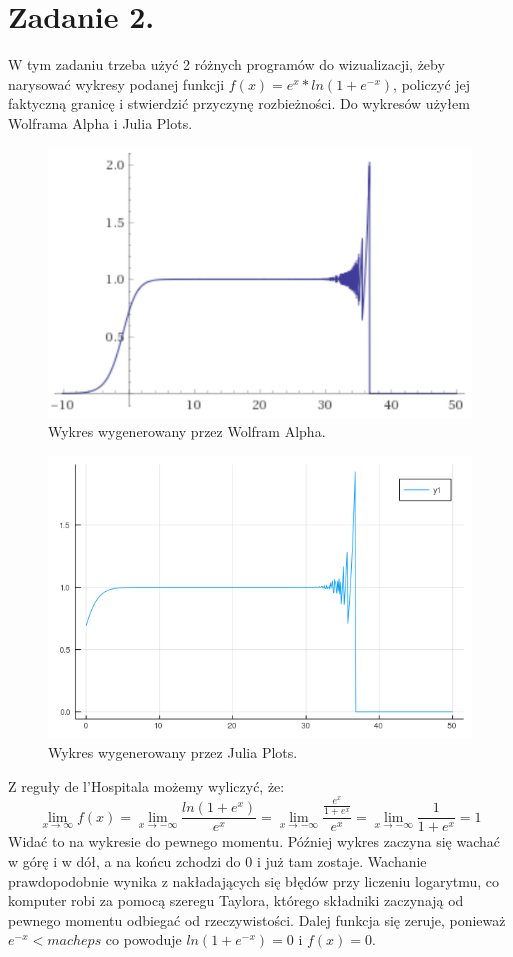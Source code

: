 \documentclass{article}
\begin{document}
\section{Zadanie 2.}
W tym zadaniu trzeba użyć 2 różnych programów do wizualizacji, żeby narysować wykresy podanej funkcji $f(x) = e^x*ln(1+ e^{-x})$, policzyć jej faktyczną granicę i stwierdzić przyczynę rozbieżności. Do wykresów użyłem Wolframa Alpha i Julia Plots.
\begin{figure}[H]
	\includegraphics[width=\linewidth]{wolfram-wykres.png}
	\caption{Wykres wygenerowany przez Wolfram Alpha.}
	\label{fig:wolfram}
\end{figure}
\begin{figure}[H]
	\includegraphics[width=\linewidth]{wykres.png}
	\caption{Wykres wygenerowany przez Julia Plots.}
	\label{fig:julia}
\end{figure}
Z reguły de l'Hospitala możemy wyliczyć, że:
\[ \lim_{x \to \infty} f(x) = \lim_{x \to -\infty} \frac{ln(1+e^x)}{e^x} = \lim_{x \to -\infty} \frac{\frac{e^x}{1+e^x}}{e^x} = \lim_{x \to -\infty} \frac{1}{1+e^x} = 1 \]
\newline
Widać to na wykresie do pewnego momentu. Później wykres zaczyna się wachać w górę i w dół, a na końcu zchodzi do 0 i już tam zostaje. Wachanie prawdopodobnie wynika z nakładających się błędów przy liczeniu logarytmu, co komputer robi za pomocą szeregu Taylora, którego składniki zaczynają od pewnego momentu odbiegać od rzeczywistości. Dalej funkcja się zeruje, ponieważ $e^{-x} < macheps$ co powoduje $ln(1+e^{-x})=0$ i $f(x)=0$.
\end{document}
